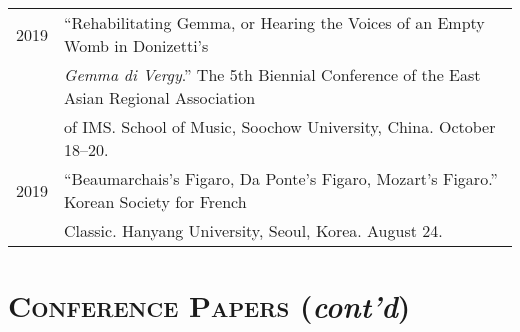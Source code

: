 \documentclass[a4paper,11pt]{article}
\begin{document}
  \hspace*{-0.25cm}
  \begin{tabular}{p{2.5cm} p{12.5cm}}
  2019 & “Rehabilitating Gemma, or Hearing the Voices of an Empty Womb in Donizetti’s\\
  & \textit{Gemma di Vergy}.” The 5th Biennial Conference of the East Asian Regional Association\\
  & of IMS. School of Music, Soochow University, China. October 18–20.\\[2mm]
  
  2019 & “Beaumarchais’s Figaro, Da Ponte’s Figaro, Mozart’s Figaro.” Korean Society for French\\
  & Classic. Hanyang University, Seoul, Korea. August 24.\\[2mm]
  \end{tabular}
  
  \section*{\textsc{Conference Papers} (\textit{cont'd})}
  
\end{document}
